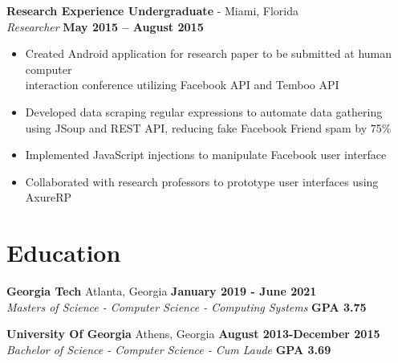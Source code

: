 \documentclass[margin,line]{resume}
\begin{document}
\begin{resume}
	\textbf{Research Experience Undergraduate} - Miami, Florida \vspace{1mm}\\\vspace{1mm}%
	\textsl{Researcher} \hfill \textbf{May 2015 -- August 2015}
	\begin{itemize}
		\item Created Android application for research paper to be submitted at human computer\\
		interaction conference utilizing Facebook API and Temboo API
		\item Developed data scraping regular expressions to automate data gathering using JSoup and REST API, reducing fake Facebook Friend spam by 75\%
		\item Implemented JavaScript injections to manipulate Facebook user interface
		\item Collaborated with research professors to prototype user interfaces using AxureRP
	\end{itemize}
	
	
	\section{\mysidestyle Education}
	
	\textbf{Georgia Tech} Atlanta, Georgia \hfill \textbf{January 2019 - June 2021}\\
	\textsl{Masters of Science - Computer Science - Computing Systems} \hfill \textbf{GPA 3.75} \vspace{2mm}
	
	\textbf{University Of Georgia} Athens, Georgia \hfill \textbf{August 2013-December 2015} \\
	\textsl{Bachelor of Science - Computer Science - Cum Laude} \hfill \textbf{GPA 3.69}\vspace{2mm}

	\end{resume}
	
\end{document}
